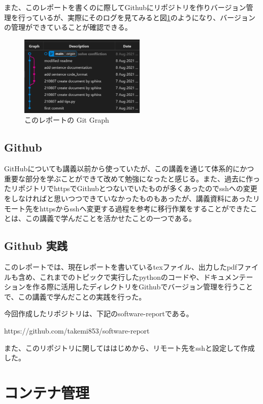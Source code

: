 \documentclass[12pt]{jsarticle}
\begin{document}
また、このレポートを書くのに際してGithubにリポジトリを作りバージョン管理を行っているが、実際にそのログを見てみると図\ref{fig:gitlog}のようになり、バージョンの管理ができていることが確認できる。

\begin{figure}[htbp]
  \begin{center}
    \includegraphics[width=6.0cm]{./vscode_git.png}
    \caption{このレポートの Git Graph}
    \label{fig:gitlog}
  \end{center}
\end{figure}

\subsection{Github}
GitHubについても講義以前から使っていたが、この講義を通じて体系的にかつ重要な部分を学ぶことができて改めて勉強になったと感じる。また、過去に作ったリポジトリでhttpsでGithubとつないでいたものが多くあったのでsshへの変更をしなければと思いつつできていなかったものもあったが、講義資料にあったリモート先をhttpsからsshへ変更する過程を参考に移行作業をすることができたことは、この講義で学んだことを活かせたことの一つである。

\subsection{Github 実践}
このレポートでは、現在レポートを書いているtexファイル、出力したpdfファイルも含め、これまでのトピックで実行したpythonのコードや、ドキュメンテーションを作る際に活用したディレクトリをGithubでバージョン管理を行うことで、この講義で学んだことの実践を行った。

今回作成したリポジトリは、下記のsoftware-reportである。

https://github.com/takemi853/software-report

また、このリポジトリに関してははじめから、リモート先をsshと設定して作成した。



\newpage
\section{コンテナ管理}
\end{document}
